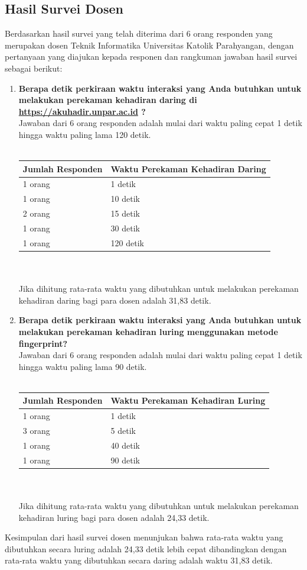\subsection{Hasil Survei Dosen}
Berdasarkan hasil survei yang telah diterima dari 6 orang responden yang merupakan dosen Teknik Informatika Universitas Katolik Parahyangan, dengan pertanyaan yang diajukan kepada responen dan rangkuman jawaban hasil survei sebagai berikut:
\begin{enumerate}
	\item \textbf{Berapa detik perkiraan waktu interaksi yang Anda butuhkan untuk melakukan perekaman kehadiran daring di \url{https://akuhadir.unpar.ac.id} ?}\\
	Jawaban dari 6 orang responden adalah mulai dari waktu paling cepat 1 detik hingga waktu paling lama 120 detik.\\ \\
	\begin{tabular}{|p{4cm} |p{7cm}|}
		\hline
		Jumlah Responden &  Waktu Perekaman Kehadiran Daring \\ \hline     
		1 orang &  1 detik\\ \hline 
		1 orang &  10 detik\\ \hline 
		2 orang &  15 detik\\ \hline 
		1 orang &  30 detik\\ \hline 
		1 orang &  120 detik\\ \hline 
	\end{tabular}\\ \\
	Jika dihitung rata-rata waktu yang dibutuhkan untuk melakukan perekaman kehadiran daring bagi para dosen adalah 31,83 detik.

	\item \textbf{Berapa detik perkiraan waktu interaksi yang Anda butuhkan untuk melakukan perekaman kehadiran luring menggunakan metode fingerprint?}\\
	Jawaban dari 6 orang responden adalah mulai dari waktu paling cepat 1 detik hingga waktu paling lama 90 detik.\\ \\
	\begin{tabular}{|p{4cm} |p{7cm}|}
		\hline
		Jumlah Responden &  Waktu Perekaman Kehadiran Luring \\ \hline     
		1 orang &  1 detik\\ \hline 
		3 orang &  5 detik\\ \hline 
		1 orang &  40 detik\\ \hline 
		1 orang &  90 detik\\ \hline 
	\end{tabular}\\ \\
	Jika dihitung rata-rata waktu yang dibutuhkan untuk melakukan perekaman kehadiran luring bagi para dosen adalah 24,33 detik.
\end{enumerate}
Kesimpulan dari hasil survei dosen menunjukan bahwa rata-rata waktu yang dibutuhkan secara luring adalah 24,33 detik lebih cepat dibandingkan dengan rata-rata waktu yang dibutuhkan secara daring adalah waktu 31,83 detik.

